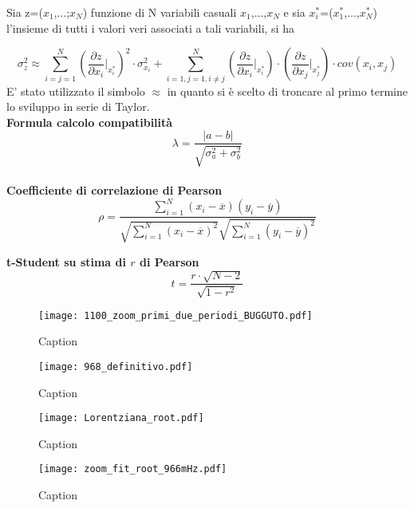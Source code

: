 \documentclass[a4paper,11pt,oneside]{article}
\begin{document}
Sia z=($x_1$,...;$x_N$) funzione di N variabili casuali $x_1$,...,$x_N$ e sia ${x_i^\ast}$=($x_1^\ast$,...,$x_N^{\ast}$) l'insieme di tutti i valori veri associati a tali variabili, si ha 

\begin{equation*}
    \sigma_z^{2}\approx  \sum_{i=j=1}^{N}\left ( \frac{\partial z}{\partial x_i}\Big|_{x_i^{\ast}} \right )^{2}\cdot\sigma_{x_i}^{2} +\sum_{i=1,j=1,i\neq j}^{N}\left (\frac{\partial z }{\partial x_i}\Big|_{x_i^{\ast}} \right ) \cdot \left ( \frac{\partial z}{\partial x_j} \Big|_{x_j^{\ast}} \right )\cdot cov(x_i,x_j)\label{eq:prop_errori}
\end{equation*}
E' stato utilizzato il simbolo $\approx$ in quanto si è scelto di troncare al primo termine lo sviluppo in serie di Taylor.\\


\textbf{Formula calcolo compatibilità}\\
\begin{equation*}
    \lambda=\frac{\left|a-b\right|}{\sqrt{\sigma^{2}_{a}+\sigma^{2}_{b}}}
\end{equation*}\\
\textbf{Coefficiente di correlazione di Pearson}\\
\begin{equation*}
    \rho=  \frac{\sum_{i=1}^{N}(x_i - \overline{x}
    )(y_i - \overline{y})}{\sqrt{\sum_{i=1}^{N}(x_i -\overline{x})^2}\sqrt{\sum_{i=1}^{N}(y_i - \overline{y})^2}}
\end{equation*}

\textbf{t-Student su stima di $r$ di Pearson}\\
\begin{equation*}
    t=\frac{r \cdot \sqrt{N-2} }{\sqrt{1- r^2}}
\end{equation*}

\begin{figure}[h!]
    \centering
    \texttt{[image: 1100\_zoom\_primi\_due\_periodi\_BUGGUTO.pdf]}
    \caption{Caption}
    \label{fig:my_label}
\end{figure}

\begin{figure}[h!]
    \centering
    \texttt{[image: 968\_definitivo.pdf]}
    \caption{Caption}
    \label{fig:my_label}
\end{figure}

\begin{figure}[h!]
    \centering
    \texttt{[image: Lorentziana\_root.pdf]}
    \caption{Caption}
    \label{fig:my_label}
\end{figure}

\begin{figure}[h!]
    \centering
    \texttt{[image: zoom\_fit\_root\_966mHz.pdf]}
    \caption{Caption}
    \label{fig:zoom_fit_root}
\end{figure}
\end{document}

